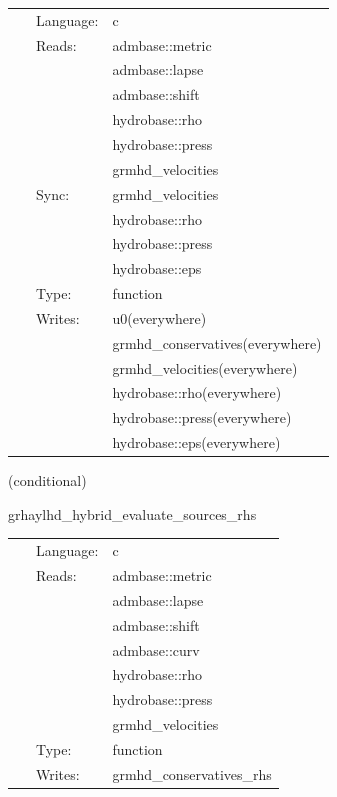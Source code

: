  \begin{tabular*}{160mm}{cll} 
~ & Language:  & c \\ 
~ & Reads:  & admbase::metric \\ 
~& ~ &admbase::lapse\\ 
~& ~ &admbase::shift\\ 
~& ~ &hydrobase::rho\\ 
~& ~ &hydrobase::press\\ 
~& ~ &grmhd\_velocities\\ 
~ & Sync:  & grmhd\_velocities \\ 
~& ~ &hydrobase::rho\\ 
~& ~ &hydrobase::press\\ 
~& ~ &hydrobase::eps\\ 
~ & Type:  & function \\ 
~ & Writes:  & u0(everywhere) \\ 
~& ~ &grmhd\_conservatives(everywhere)\\ 
~& ~ &grmhd\_velocities(everywhere)\\ 
~& ~ &hydrobase::rho(everywhere)\\ 
~& ~ &hydrobase::press(everywhere)\\ 
~& ~ &hydrobase::eps(everywhere)\\ 
\end{tabular*} 


\vspace{5mm}

   (conditional) 

\hspace{5mm} grhaylhd\_hybrid\_evaluate\_sources\_rhs 

\hspace{5mm}{\it hybrid version of grhaylhd\_evaluate\_sources\_rhs } 


\hspace{5mm}

 \begin{tabular*}{160mm}{cll} 
~ & Language:  & c \\ 
~ & Reads:  & admbase::metric \\ 
~& ~ &admbase::lapse\\ 
~& ~ &admbase::shift\\ 
~& ~ &admbase::curv\\ 
~& ~ &hydrobase::rho\\ 
~& ~ &hydrobase::press\\ 
~& ~ &grmhd\_velocities\\ 
~ & Type:  & function \\ 
~ & Writes:  & grmhd\_conservatives\_rhs \\ 
\end{tabular*} 



